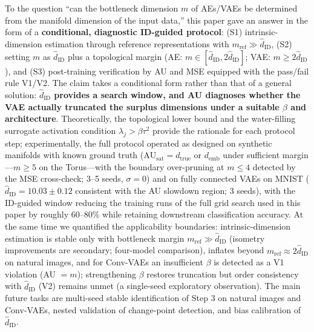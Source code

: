 \documentclass[make,article,submit,pdftex,moreauthors]{Definitions/mdpi}
\newcommand{\hatdID}{\hat{d}_{\mathrm{ID}}}
\newcommand{\dtrue}{d_{\mathrm{true}}}
\newcommand{\AUsat}{\mathrm{AU}_{\mathrm{sat}}}
\newcommand{\demb}{d_{\mathrm{emb}}}
\begin{document}
To the question ``can the bottleneck dimension $m$ of AEs/VAEs be determined
from the manifold dimension of the input data,'' this paper gave an answer
in the form of a \textbf{conditional, diagnostic ID-guided protocol}:
(S1) intrinsic-dimension estimation through reference representations with
$m_{\mathrm{ref}} \gg \hatdID$,
(S2) setting $m$ as $\hatdID$ plus a topological margin
(AE: $m \in [\hatdID, 2\hatdID]$; VAE: $m \geq 2\hatdID$), and
(S3) post-training verification by AU and MSE equipped with the pass/fail
rule V1/V2.
The claim takes a conditional form rather than that of a general solution:
\textbf{$\hatdID$ provides a search window, and AU diagnoses whether the
VAE actually truncated the surplus dimensions under a suitable $\beta$ and
architecture}.
Theoretically, the topological lower bound and the water-filling surrogate
activation condition $\lambda_j > \beta\tau^2$ provide the rationale for
each protocol step;
experimentally, the full protocol operated as designed on synthetic
manifolds with known ground truth ($\AUsat = \dtrue$ or $\demb$ under
sufficient margin---$m \geq 5$ on the Torus---with the boundary
over-pruning at $m \leq 4$ detected by the MSE cross-check; 3--5 seeds,
$\sigma = 0$) and on fully connected VAEs on MNIST
($\hatdID = 10.03 \pm 0.12$ consistent with the AU slowdown region;
3 seeds), with the ID-guided window reducing the training runs of the full
grid search used in this paper by roughly 60--80\% while retaining
downstream classification accuracy.
At the same time we quantified the applicability boundaries:
intrinsic-dimension estimation is stable only with bottleneck margin
$m_{\mathrm{ref}} \gg \hatdID$ (isometry improvements are secondary;
four-model comparison), inflates beyond
$m_{\mathrm{ref}} \approx 2\hatdID$ on natural images, and for Conv-VAEs an
insufficient $\beta$ is detected as a V1 violation (AU $= m$); strengthening
$\beta$ restores truncation but order consistency with $\hatdID$ (V2)
remains unmet (a single-seed exploratory observation).
The main future tasks are multi-seed stable identification of Step 3 on
natural images and Conv-VAEs, nested validation of change-point detection,
and bias calibration of $\hatdID$.


\end{document}
